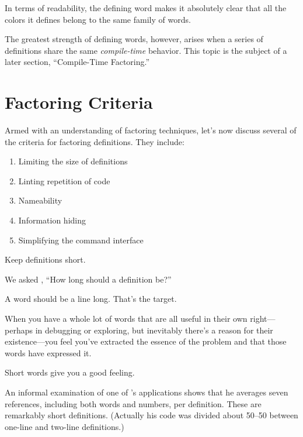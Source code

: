 In terms of readability, the defining word makes it absolutely clear
that all the colors it defines belong to the same family of words.

The greatest strength of defining words, however, arises when a series
of definitions share the same \emph{compile-time} behavior. This topic
is the subject of a later section, ``Compile-Time Factoring.''

\section{Factoring Criteria}
Armed with an understanding of factoring techniques, let's now discuss
several of the criteria for factoring \Forth{} definitions. They
include:

\begin{enumerate}
\item Limiting the size of definitions
\item Linting repetition of code
\item Nameability
\item Information hiding
\item Simplifying the command interface
\end{enumerate}

\begin{tip}
Keep definitions short.
\end{tip}

\begin{interview}
We asked ,
``How long should a \Forth{} definition be?''

\begin{tfquot}
A word should be a line long. That's the target.

When you have a whole lot of words that are all useful in their own
right---perhaps in debugging or exploring, but inevitably there's a
reason for their existence---you feel you've extracted the essence of
the problem and that those words have expressed it.

Short words give you a good feeling.
\end{tfquot}
\end{interview}
An informal examination of one of 's applications shows
that he averages seven references, including both words and numbers,
per definition. These are remarkably short definitions. (Actually his
code was divided about 50--50 between one-line and two-line
definitions.)

